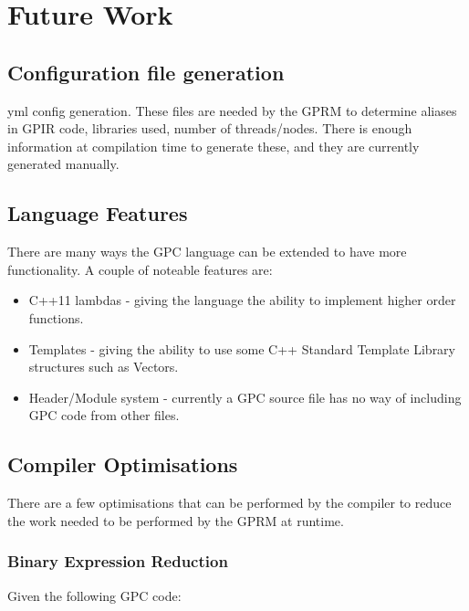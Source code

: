 \chapter{Future Work}
\label{ch:future}

\section{Configuration file generation}
    yml config generation.
    These files are needed by the GPRM to determine aliases in GPIR code, libraries used,
    number of threads/nodes. There is enough information at compilation time to generate these,
    and they are currently generated manually. 


\section{Language Features}
    There are many ways the GPC language can be extended to have more
    functionality. A couple of noteable features are:
    \begin{itemize}
        \item C++11 lambdas - giving the language the ability to implement higher order functions.
        \item Templates - giving the ability to use some C++ Standard Template Library structures such as Vectors.
        \item Header/Module system - currently a GPC source file has no way of including GPC code
    from other files.

    \end{itemize} 

\section{Compiler Optimisations}

    There are a few optimisations that can be performed by the compiler to reduce the work needed to be 
    performed by the GPRM at runtime.

\subsection{Binary Expression Reduction}
Given the following GPC code:    




